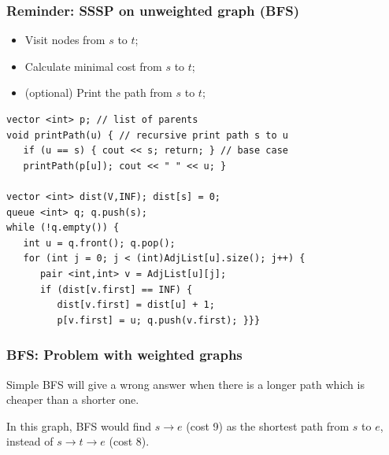 \documentclass{beamer}
\begin{document}
\begin{frame}
  \frametitle{Reminder: SSSP on unweighted graph (BFS)}

{\smaller
    \begin{itemize}
    \item Visit nodes from $s$ to $t$;
    \item Calculate minimal cost from $s$ to $t$;
    \item (optional) Print the path from $s$ to $t$;
    \end{itemize}

\begin{exampleblock}{}
\begin{verbatim}
vector <int> p; // list of parents
void printPath(u) { // recursive print path s to u
   if (u == s) { cout << s; return; } // base case
   printPath(p[u]); cout << " " << u; }

vector <int> dist(V,INF); dist[s] = 0;
queue <int> q; q.push(s);
while (!q.empty()) {
   int u = q.front(); q.pop();
   for (int j = 0; j < (int)AdjList[u].size(); j++) {
      pair <int,int> v = AdjList[u][j];
      if (dist[v.first] == INF) { 
         dist[v.first] = dist[u] + 1;
         p[v.first] = u; q.push(v.first); }}}
\end{verbatim}
\end{exampleblock}
}
\end{frame}

\begin{frame}
  \frametitle{BFS: Problem with weighted graphs}

  \begin{block}{}
    Simple BFS will give a wrong answer when there is a longer path
    which is cheaper than a shorter one.
  \end{block}
  
  \medskip

  \begin{center}
  \end{center}

  \bigskip

  In this graph, BFS would find $s \rightarrow e$ (cost 9) as the
  shortest path from $s$ to $e$, instead of $s \rightarrow t
  \rightarrow e$ (cost 8).
\end{frame}
\end{document}
